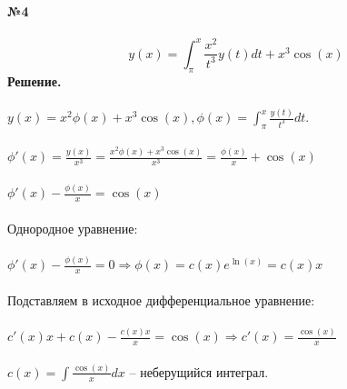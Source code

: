 \documentclass[10pt,a4paper]{article}
\begin{document}
	\noindent\textbf{№4} \\  \\
	$$y(x) = \int_{\pi}^{x}\frac{x^2}{t^3}y(t)dt + x^3\cos(x)$$
	\textbf{Решение.} \\ \\
	$y(x) = x^2\phi(x) + x^3\cos(x), \phi(x) = \int_{\pi}^{x}\frac{y(t)}{t^3}dt.$ \\  \\
	$\phi'(x) = \frac{y(x)}{x^3} = \frac{x^2\phi(x) + x^3\cos(x)}{x^3} = \frac{\phi(x)}{x} + \cos(x)$\\ \\
	$\phi'(x) - \frac{\phi(x)}{x} = \cos(x)$ \\ \\ 
	Однородное уравнение: \\ \\
	$\phi'(x) - \frac{\phi(x)}{x} = 0 \Rightarrow \phi(x) = c(x)e^{\ln(x)} = c(x)x$ \\ \\ 
	Подставляем в исходное дифференциальное уравнение: \\ \\
	$c'(x)x + c(x) - \frac{c(x)x}{x} = \cos(x) \Rightarrow c'(x) = \frac{\cos(x)}{x}$ \\ \\
	$c(x) = \int\frac{\cos(x)}{x}dx$ -- неберущийся интеграл. \\ \\
\end{document}
